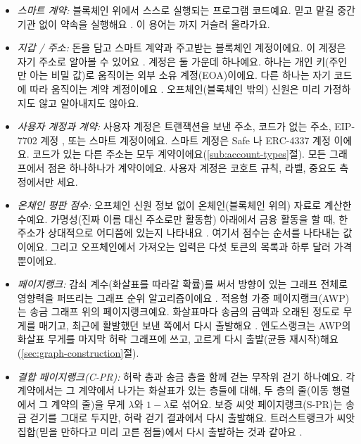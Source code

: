 \begin{itemize}
\item \emph{스마트 계약:} 블록체인 위에서 스스로 실행되는 프로그램 코드예요. 믿고 맡길 중간 기관 없이 약속을 실행해요 \parencite{buterin2014ethereum}. 이 용어는 \textcite{szabo1997formalizing}까지 거슬러 올라가요.
\item \emph{지갑 / 주소:} 돈을 담고 스마트 계약과 주고받는 블록체인 계정이에요. 이 계정은 자기 주소로 알아볼 수 있어요 \parencite{buterin2014ethereum}. 계정은 둘 가운데 하나예요. 하나는 개인 키(주인만 아는 비밀 값)로 움직이는 외부 소유 계정(EOA)이에요. 다른 하나는 자기 코드에 따라 움직이는 계약 계정이에요 \parencite{antonopoulos2018mastering}. 오프체인(블록체인 밖의) 신원은 미리 가정하지도 않고 알아내지도 않아요.
\item \emph{사용자 계정과 계약:} 사용자 계정은 트랜잭션을 보낸 주소, 코드가 없는 주소, EIP-7702 계정 \parencite{buterin2024eip7702}, 또는 스마트 계정이에요. 스마트 계정은 Safe \parencite{safenddocs}나 ERC-4337 계정 \parencite{buterin2021erc4337}이에요. 코드가 있는 다른 주소는 모두 계약이에요(\ref{sub:account-types}절). 모든 그래프에서 점은 하나하나가 계약이에요. 사용자 계정은 코호트 규칙, 라벨, 중요도 측정에서만 세요.
\item \emph{온체인 평판 점수:} 오프체인 신원 정보 없이 온체인(블록체인 위의) 자료로 계산한 수예요. 가명성(진짜 이름 대신 주소로만 활동함) 아래에서 금융 활동을 할 때, 한 주소가 상대적으로 어디쯤에 있는지 나타내요 \parencite{do2023hodgerank}. 여기서 점수는 순서를 나타내는 값이에요. 그리고 오프체인에서 가져오는 입력은 다섯 토큰의 목록과 하루 달러 가격뿐이에요.
\item \emph{페이지랭크:} 감쇠 계수(화살표를 따라갈 확률)를 써서 방향이 있는 그래프 전체로 영향력을 퍼뜨리는 그래프 순위 알고리즘이에요 \parencite{page1999pagerank}. 적응형 가중 페이지랭크(AWP)는 송금 그래프 위의 페이지랭크예요. 화살표마다 송금의 금액과 오래된 정도로 무게를 매기고, 최근에 활발했던 보낸 쪽에서 다시 출발해요 \parencite{do2023awp}. 엔도스랭크는 AWP의 화살표 무게를 마지막 허락 그래프에 쓰고, 고르게 다시 출발(균등 재시작)해요(\ref{sec:graph-construction}절).
\item \emph{결합 페이지랭크(\mbox{C-PR}):} 허락 층과 송금 층을 함께 걷는 무작위 걷기 하나예요. 각 계약에서는 그 계약에서 나가는 화살표가 있는 층들에 대해, 두 층의 줄(이동 행렬에서 그 계약의 줄)을 무게 $\lambda$와 $1-\lambda$로 섞어요. 보증 씨앗 페이지랭크(\mbox{S-PR})는 송금 걷기를 그대로 두지만, 허락 걷기 결과에서 다시 출발해요. 트러스트랭크가 씨앗 집합(믿을 만하다고 미리 고른 점들)에서 다시 출발하는 것과 같아요 \parencite{gyongyi2004trustrank}.

\end{itemize}
